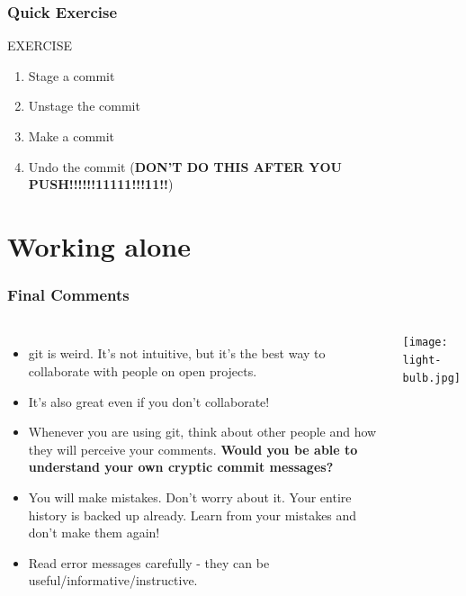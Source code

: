 \documentclass{beamer}
\begin{document}
\begin{frame}[fragile]
\frametitle{Quick Exercise}
    \begin{block}{EXERCISE}
        \begin{enumerate}
        \item Stage a commit
        \item Unstage the commit
        \item Make a commit
        \item Undo the commit (\textbf{DON'T DO THIS AFTER YOU PUSH!!!!!!11111!!!11!!})
        \end{enumerate}
    \end{block}

\end{frame}

\section{Working alone}

\begin{frame}
\frametitle{Final Comments}
\begin{columns}
\begin{itemize}
\item git is weird. It's not intuitive, but it's the best way to collaborate with people on open projects.
\item It's also great even if you don't collaborate!
\item Whenever you are using git, think about other people and how they will perceive your comments. \textbf{Would you be able to understand your own cryptic commit messages?}
\item You will make mistakes. Don't worry about it. Your entire history is backed up already. Learn from your mistakes and don't make them again!
\item Read error messages carefully - they can be useful/informative/instructive.
\end{itemize}
\texttt{[image: light-bulb.jpg]}
\end{columns}
\end{frame}
\end{document}
